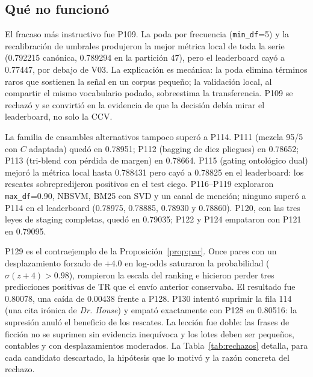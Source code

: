\subsection{Qué no funcionó}

El fracaso más instructivo fue P109. La poda por frecuencia
(\texttt{min\_df}=5) y la recalibración de umbrales produjeron la mejor
métrica local de toda la serie (0.792215 canónica, 0.789294 en la partición
47), pero el leaderboard cayó a 0.77447, por debajo de V03. La explicación es
mecánica: la poda elimina términos raros que sostienen la señal en un corpus
pequeño; la validación local, al compartir el mismo vocabulario podado,
sobreestima la transferencia. P109 se rechazó y se convirtió en la evidencia
de que la decisión debía mirar el leaderboard, no solo la CCV.

La familia de ensambles alternativos tampoco superó a P114. P111 (mezcla
95/5 con $C$ adaptada) quedó en 0.78951; P112 (bagging de diez pliegues) en
0.78652; P113 (tri-blend con pérdida de margen) en 0.78664. P115 (gating
ontológico dual) mejoró la métrica local hasta 0.788431 pero cayó a 0.78825
en el leaderboard: los rescates sobrepredijeron positivos en el test ciego.
P116--P119 exploraron \texttt{max\_df}=0.90, NBSVM, BM25 con SVD y un canal
de mención; ninguno superó a P114 en el leaderboard (0.78975, 0.78885,
0.78930 y 0.78860). P120, con las tres leyes de staging completas, quedó en
0.79035; P122 y P124 empataron con P121 en 0.79095.

P129 es el contraejemplo de la Proposición~\ref{prop:par}. Once pares con un
desplazamiento forzado de $+4.0$ en log-odds saturaron la probabilidad
($\sigma(z+4)>0.98$), rompieron la escala del ranking e hicieron perder tres
predicciones positivas de TR que el envío anterior conservaba. El resultado fue
0.80078, una
caída de 0.00438 frente a P128. P130 intentó suprimir la fila 114 (una cita
irónica de \emph{Dr. House}) y empató exactamente con P128 en 0.80516: la
supresión anuló el beneficio de los rescates. La lección fue doble: las
frases de ficción no se suprimen sin evidencia inequívoca y los lotes deben
ser pequeños, contables y con desplazamientos moderados. La
Tabla~\ref{tab:rechazos} detalla, para cada candidato descartado, la
hipótesis que lo motivó y la razón concreta del rechazo.

